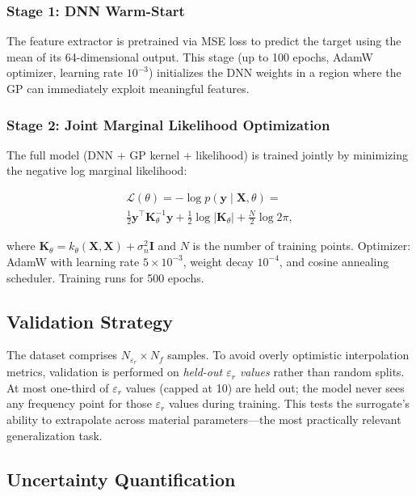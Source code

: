 \documentclass[conference]{IEEEtran}
\begin{document}
\subsubsection{Stage 1: DNN Warm-Start}
The feature extractor is pretrained via MSE loss to predict the target using the mean of its 64-dimensional output. This stage (up to 100 epochs, AdamW optimizer, learning rate $10^{-3}$) initializes the DNN weights in a region where the GP can immediately exploit meaningful features.

\subsubsection{Stage 2: Joint Marginal Likelihood Optimization}
The full model (DNN + GP kernel + likelihood) is trained jointly by minimizing the negative log marginal likelihood:

\begin{multline}\label{eq:mll}
\mathcal{L}(\theta) = -\log p(\mathbf{y} \mid \mathbf{X}, \theta) =\\
\frac{1}{2} \mathbf{y}^\top \mathbf{K}_\theta^{-1} \mathbf{y}
+ \frac{1}{2} \log |\mathbf{K}_\theta|
+ \frac{N}{2} \log 2\pi,
\end{multline}

where $\mathbf{K}_\theta = k_\theta(\mathbf{X}, \mathbf{X}) + \sigma_n^2 \mathbf{I}$ and $N$ is the number of training points. Optimizer: AdamW with learning rate $5\times10^{-3}$, weight decay $10^{-4}$, and cosine annealing scheduler. Training runs for 500 epochs.

\subsection{Validation Strategy}

The dataset comprises $N_{\varepsilon_r} \times N_f$ samples. To avoid overly optimistic interpolation metrics, validation is performed on \emph{held-out $\varepsilon_r$ values} rather than random splits. At most one-third of $\varepsilon_r$ values (capped at 10) are held out; the model never sees any frequency point for those $\varepsilon_r$ values during training. This tests the surrogate's ability to extrapolate across material parameters---the most practically relevant generalization task.

\subsection{Uncertainty Quantification}
\end{document}
